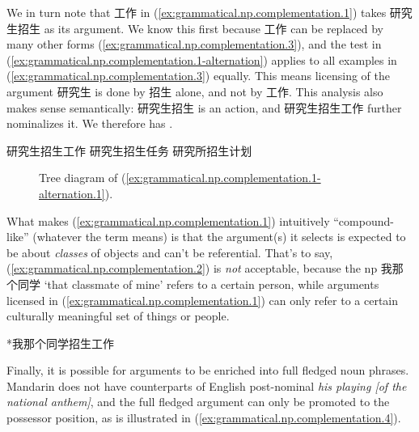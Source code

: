 \documentclass[UTF8, a4paper, oneside, scheme=plain, 12pt]{ctexrep}
\newcommand{\form}[1]{\emph{#1}}
\newcommand{\translate}[1]{`#1'}
\begin{document}
We in turn note that 工作 in (\ref{ex:grammatical.np.complementation.1}) takes 研究生招生 as its argument.
We know this first because 工作 can be replaced by many other forms 
(\ref{ex:grammatical.np.complementation.3}),
and the test in (\ref{ex:grammatical.np.complementation.1-alternation})
applies to all examples in (\ref{ex:grammatical.np.complementation.3}) equally.
This means licensing of the argument 研究生 is done by 招生 alone,
and not by 工作.
This analysis also makes sense semantically:
研究生招生 is an action, and 研究生招生工作 further nominalizes it.
We therefore has .

\begin{exe}
    \ex\label{ex:grammatical.np.complementation.3} \begin{xlist}
        \ex\label{ex:grammatical.np.complementation.3.1} 研究生招生工作
        \ex 研究生招生任务
        \ex 研究所招生计划
    \end{xlist}
\end{exe}

\begin{figure}[H]
    \centering
    {
        \small
        
    }
    \caption{Tree diagram of (\ref{ex:grammatical.np.complementation.1-alternation.1}).}
    \label{fig:grammatical.np.complementation.1-alternation.1}
\end{figure}

What makes (\ref{ex:grammatical.np.complementation.1}) intuitively ``compound-like'' (whatever the term means) is that
the argument(s) it selects is expected to be about \emph{classes} of objects and can't be referential.
That's to say, (\ref{ex:grammatical.np.complementation.2})
is \emph{not} acceptable, because the \ac{np} 我那个同学 \translate{that classmate of mine}
refers to a certain person, while arguments licensed in (\ref{ex:grammatical.np.complementation.1})
can only refer to a certain culturally meaningful set of things or people.

\begin{exe}
    \ex\label{ex:grammatical.np.complementation.2} *我那个同学招生工作
\end{exe}

Finally, it is possible for arguments to be enriched into full fledged noun phrases.
Mandarin does not have counterparts of English post-nominal \form{his playing [of the national anthem]},
and the full fledged argument can only be promoted to the possessor position,
as is illustrated in (\ref{ex:grammatical.np.complementation.4}).
\end{document}
